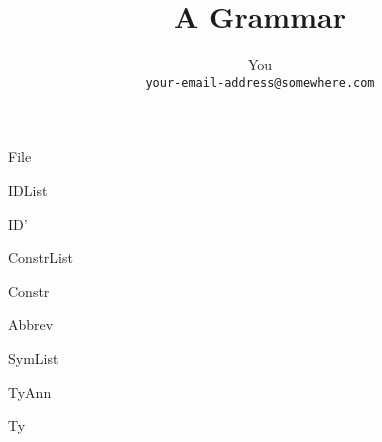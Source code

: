 \documentclass[11pt]{article}
\title{A Grammar}
\author{You\\
\texttt{your-email-address@somewhere.com}}
\begin{document}
\maketitle

\begin{Grammar}

\begin{Rules}{File}
\end{Rules}


\begin{Rules}{IDList}
\end{Rules}

\begin{Rules}{ID'}
\end{Rules}

\begin{Rules}{ConstrList}
\end{Rules}

\begin{Rules}{Constr}
\end{Rules}

\begin{Rules}{Abbrev}
\end{Rules}

\begin{Rules}{SymList}
\end{Rules}

\begin{Rules}{TyAnn}
\end{Rules}

\begin{Rules}{Ty}
\RHS{\sym{\{} \sym{\}}}
\end{Rules}


\end{Grammar}
\end{document}
